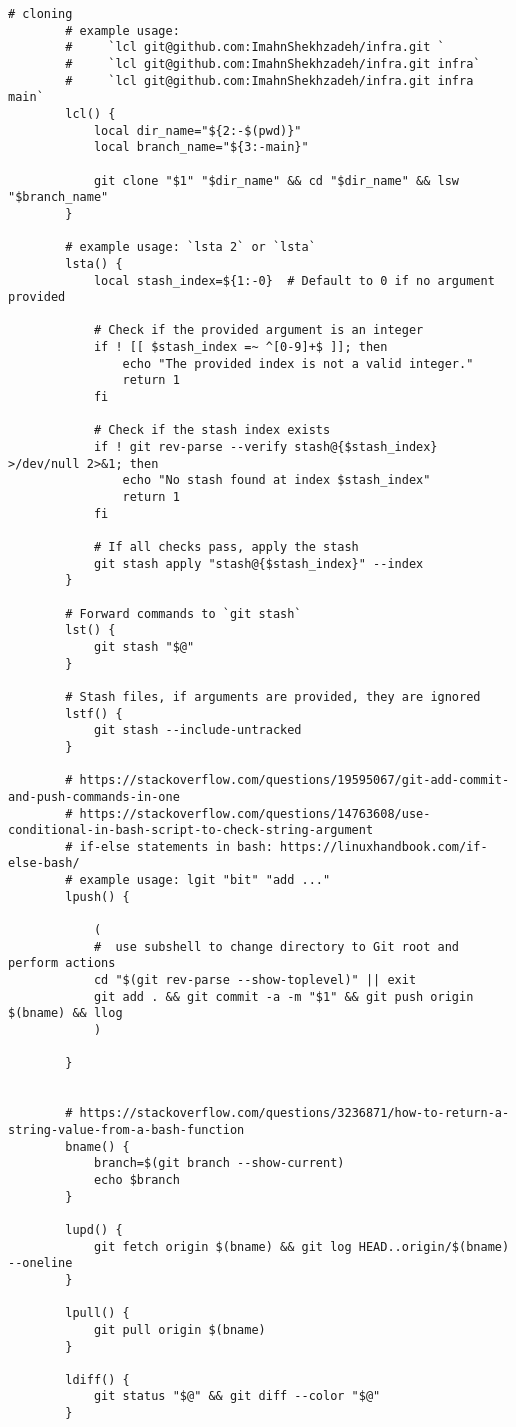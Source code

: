 \documentclass[12pt, a4paper]{scrbook}
\numberwithin{equation}{section}
\theoremstyle{definition}
\theoremstyle{definition}
\begin{document}
\begin{lstlisting}[style=mystylebash, label=alg:bashrc_contents, xleftmargin=\parindent]
		# cloning
		# example usage:
		#     `lcl git@github.com:ImahnShekhzadeh/infra.git `
		#     `lcl git@github.com:ImahnShekhzadeh/infra.git infra`
		#     `lcl git@github.com:ImahnShekhzadeh/infra.git infra main`
		lcl() {
			local dir_name="${2:-$(pwd)}"
			local branch_name="${3:-main}"
			
			git clone "$1" "$dir_name" && cd "$dir_name" && lsw "$branch_name"
		}

		# example usage: `lsta 2` or `lsta` 
		lsta() {
			local stash_index=${1:-0}  # Default to 0 if no argument provided
			
			# Check if the provided argument is an integer
			if ! [[ $stash_index =~ ^[0-9]+$ ]]; then
				echo "The provided index is not a valid integer."
				return 1
			fi
			
			# Check if the stash index exists
			if ! git rev-parse --verify stash@{$stash_index} >/dev/null 2>&1; then
				echo "No stash found at index $stash_index"
				return 1  
			fi
			
			# If all checks pass, apply the stash
			git stash apply "stash@{$stash_index}" --index
		}
		
		# Forward commands to `git stash`
		lst() {
			git stash "$@"
		}
		
		# Stash files, if arguments are provided, they are ignored
		lstf() {
			git stash --include-untracked
		}

		# https://stackoverflow.com/questions/19595067/git-add-commit-and-push-commands-in-one
		# https://stackoverflow.com/questions/14763608/use-conditional-in-bash-script-to-check-string-argument
		# if-else statements in bash: https://linuxhandbook.com/if-else-bash/
		# example usage: lgit "bit" "add ..."
		lpush() {
			
			(
			#  use subshell to change directory to Git root and perform actions 
			cd "$(git rev-parse --show-toplevel)" || exit
			git add . && git commit -a -m "$1" && git push origin $(bname) && llog
			)
			
		}
	
	
		# https://stackoverflow.com/questions/3236871/how-to-return-a-string-value-from-a-bash-function
		bname() {
			branch=$(git branch --show-current)
			echo $branch    
		}
		
		lupd() {
			git fetch origin $(bname) && git log HEAD..origin/$(bname) --oneline
		}
		
		lpull() {
			git pull origin $(bname)
		}
		
		ldiff() {
			git status "$@" && git diff --color "$@"
		}
		

\end{lstlisting}
\end{document}

